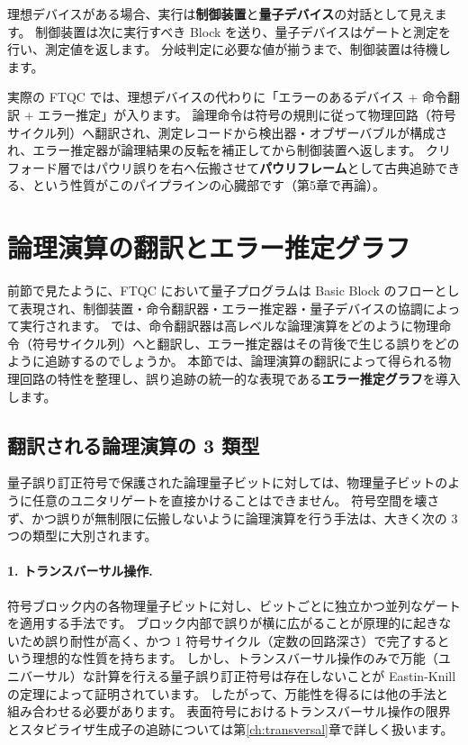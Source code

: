 理想デバイスがある場合、実行は\textbf{制御装置}と\textbf{量子デバイス}の対話として見えます。
制御装置は次に実行すべき Block を送り、量子デバイスはゲートと測定を行い、測定値を返します。
分岐判定に必要な値が揃うまで、制御装置は待機します。

実際の FTQC では、理想デバイスの代わりに「エラーのあるデバイス + 命令翻訳 + エラー推定」が入ります。
論理命令は符号の規則に従って物理回路（符号サイクル列）へ翻訳され、測定レコードから検出器・オブザーバブルが構成され、エラー推定器が論理結果の反転を補正してから制御装置へ返します。
クリフォード層ではパウリ誤りを右へ伝搬させて\textbf{パウリフレーム}として古典追跡できる、という性質がこのパイプラインの心臓部です（第5章で再論）。


\section{論理演算の翻訳とエラー推定グラフ}\label{sec:error_graph}

前節で見たように、FTQC において量子プログラムは Basic Block のフローとして表現され、制御装置・命令翻訳器・エラー推定器・量子デバイスの協調によって実行されます。
では、命令翻訳器は高レベルな論理演算をどのように物理命令（符号サイクル列）へと翻訳し、エラー推定器はその背後で生じる誤りをどのように追跡するのでしょうか。
本節では、論理演算の翻訳によって得られる物理回路の特性を整理し、誤り追跡の統一的な表現である\textbf{エラー推定グラフ}を導入します。

\subsection{翻訳される論理演算の 3 類型}

量子誤り訂正符号で保護された論理量子ビットに対しては、物理量子ビットのように任意のユニタリゲートを直接かけることはできません。
符号空間を壊さず、かつ誤りが無制限に伝搬しないように論理演算を行う手法は、大きく次の 3 つの類型に大別されます。

\paragraph{1. トランスバーサル操作.}
符号ブロック内の各物理量子ビットに対し、ビットごとに独立かつ並列なゲートを適用する手法です。
ブロック内部で誤りが横に広がることが原理的に起きないため誤り耐性が高く、かつ 1 符号サイクル（定数の回路深さ）で完了するという理想的な性質を持ちます。
しかし、トランスバーサル操作のみで万能（ユニバーサル）な計算を行える量子誤り訂正符号は存在しないことが Eastin-Knill の定理\cite{eastin2009transversal}によって証明されています。
したがって、万能性を得るには他の手法と組み合わせる必要があります。
表面符号におけるトランスバーサル操作の限界とスタビライザ生成子の追跡については第\ref{ch:transversal}章で詳しく扱います。

